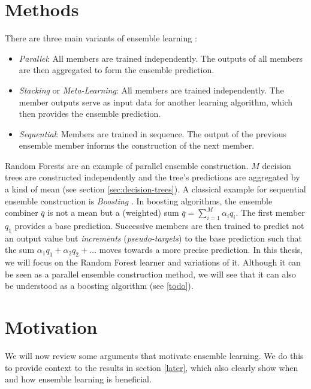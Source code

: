 \documentclass[
    a4paper, %
	fontsize=10pt, %
	twoside=false, %
]{kaobook}
\begin{document}
\section{Methods}
\label{sec:ensemble-learning-methods}
There are three main variants of ensemble learning \cite{mienye_SurveyEnsembleLearning_2022}:
\begin{itemize}
\item \textit{Parallel}: All members are trained independently. The outputs of all members are then aggregated to form the ensemble prediction.
\item \textit{Stacking} or \textit{Meta-Learning}: All members are trained independently. The member outputs serve as input data for another learning algorithm, which then provides the ensemble prediction.
\item \textit{Sequential}: Members are trained in sequence. The output of the previous ensemble member informs the construction of the next member.
\end{itemize}
Random Forests \cite{breiman_RandomForests_2001} are an example of parallel ensemble construction. $M$ decision trees are constructed independently and the tree's predictions are aggregated by a kind of mean (see section \ref{sec:decision-trees}). A classical example for sequential ensemble construction is \textit{Boosting} \cite{schapire_BoostingFoundationsAlgorithms_2012}. In boosting algorithms, the ensemble combiner $\bar{q}$ is not a mean but a (weighted) sum $\bar{q} = \sum_{i=1}^M \alpha_{i}q_{i}$. The first member $q_{1}$ provides a base prediction. Successive members are then trained to predict not an output value but \textit{increments} (\textit{pseudo-targets}) to the base prediction such that the sum $\alpha_{1}q_{1} + \alpha_{2}q_{2} + \dots$ moves towards a more precise prediction. 
In this thesis, we will focus on the Random Forest learner and variations of it. Although it can be seen as a parallel ensemble construction method, we will see that it can also be understood as a boosting algorithm (see \ref{todo}).

\section{Motivation}
\label{sec:ensemble-learning-motivation}

We will now review some arguments that motivate ensemble learning. We do this to provide context to the results in section \ref{later}, which also clearly show when and how ensemble learning is beneficial.
\end{document}
